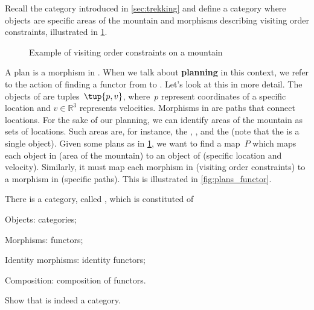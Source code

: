 \begin{example}
Recall the category \Berg introduced in \cref{sec:trekking} and define a category \Plans where objects are specific areas of the mountain and morphisms describing visiting order constraints, illustrated in \cref{fig:visiting_order_constraints}.


\begin{figure}[h]
\begin{center}
\end{center}
\caption{Example of visiting order constraints on a mountain}
\label{fig:visiting_order_constraints}
\end{figure}
A plan is a morphism in \Plans. When we talk about \textbf{planning} in this context, we refer to the action of finding a functor from \Plans to \Berg. Let's look at this in more detail. The objects of \Berg are tuples~$\tup{p,v}$, where~$p$ represent coordinates of a specific location and $v\in \mathbb{R}^3$ represents velocities. Morphisms in \Berg are paths that connect locations. For the sake of our planning, we can identify areas of the mountain as sets of locations. Such areas are, for instance, the , , and the  (note that the  is a single object). Given some plans as in \cref{fig:visiting_order_constraints}, we want to find a map~$P$ which maps each object in \Plans (area of the mountain) to an object of \Berg (specific location and velocity). Similarly, it must map each morphism in \Plans (visiting order constraints) to a morphism in \Berg (specific paths). This is illustrated in \cref{fig:plans_functor}.
\end{example}

\begin{exercise}
There is a category, called \Category, which is constituted of
\begin{compactitem}
\item Objects: categories;
\item Morphisms: functors;
\item Identity morphisms: identity functors;
\item Composition: composition of functors.
\end{compactitem}
Show that \Category is indeed a category.
\end{exercise}

